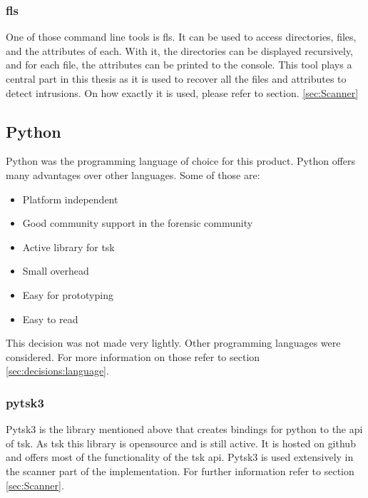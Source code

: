 \subsubsection{fls}
\label{sec:fls}

One of those command line tools is fls. It can be used to access directories, files, and the attributes of each. With it, the directories can be displayed recursively, and for each file, the attributes can be printed to the console. \cite{tsk:fls} This tool plays a central part in this thesis as it is used to recover all the files and attributes to detect intrusions. On how exactly it is used, please refer to section. \ref{sec:Scanner}

\subsection{Python}
\label{sec:python}

Python was the programming language of choice for this product. Python offers many advantages over other languages. Some of those are:

\begin{itemize}
    \item Platform independent
    \item Good community support in the forensic community
    \item Active library for \gls{tsk}
    \item Small overhead
    \item Easy for prototyping
    \item Easy to read
\end{itemize}

This decision was not made very lightly. Other programming languages were considered. For more information on those refer to section \ref{sec:decisions:language}.

\subsubsection{pytsk3}
\label{sec:pytsk3}

Pytsk3 is the library mentioned above that creates bindings for python to the \gls{api} of \gls{tsk}. As \gls{tsk} this library is \gls{opensource} and is still active. It is hosted on \gls{github} and offers most of the functionality of the \gls{tsk} \gls{api}. Pytsk3 is used extensively in the scanner part of the implementation. For further information refer to section \ref{sec:Scanner}.

